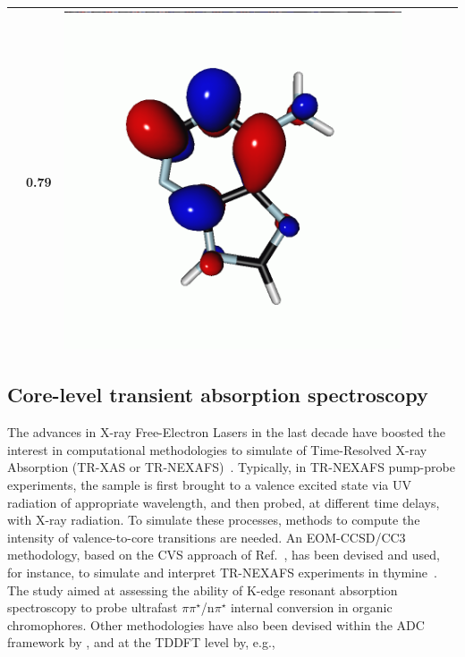 \documentclass[journal=jctcce,manuscript=article]{achemso}
\begin{document}
\begin{table}[H]
\begin{tabular}{ l | c c c | c c c }
\begin{minipage}{0.2\textwidth}
    \end{minipage}
    & 0.79 & 
    \begin{minipage}{0.2\textwidth}
        \centering
        \includegraphics[scale=0.10]{NTO/Adenine_N/3p_Cs.png}
    \end{minipage}
    \\
    \hline
\end{tabular}
\end{table}


\subsection{Core-level transient absorption spectroscopy}

The advances in X-ray Free-Electron Lasers in the last decade
have boosted the interest in computational methodologies to simulate of Time-Resolved X-ray Absorption (TR-XAS or TR-NEXAFS)~\cite{Milne2014,TransientXAS_H2O,acac_ultrafast_ISC,naturecomm}. Typically, in TR-NEXAFS pump-probe experiments, the sample is first brought to a valence excited state via UV radiation of appropriate wavelength, and then probed, at different time delays, with X-ray radiation. 
To simulate these processes, methods to compute the intensity of valence-to-core transitions  are needed.
An EOM-CCSD/CC3 methodology, based on the CVS approach of Ref.~, has been devised and used, for 
instance, to simulate and interpret TR-NEXAFS experiments in thymine~\cite{naturecomm}. The study aimed at assessing 
the ability of K-edge resonant absorption spectroscopy 
to probe ultrafast $\pi\pi^\star$/n$\pi^\star$ internal 
conversion in organic chromophores.
Other methodologies have also been devised within the ADC framework
by \citeauthor{Neville_ADC_TRNEXAFS}
\cite{Neville_ADC_TRNEXAFS,Neville_TRXAS,Neville_TRXAS_at_CI}, and at the TDDFT level by, e.g.,~\citeauthor{acac_ultrafast_ISC}\cite{acac_ultrafast_ISC}
\end{document}
